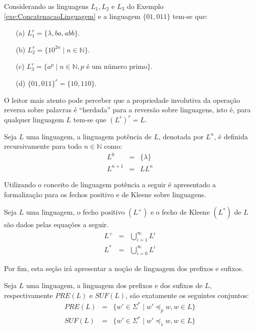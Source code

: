\begin{example}
	Considerando as linguagens $L_1, L_2$ e $L_3$ do Exemplo \ref{exe:ConcatenacaoLinguagem} e a linguagem $\{01, 011\}$ tem-se que:
	\begin{itemize}
		\item[(a)] $L_1^r = \{\lambda, ba, abb\}$.
		\item[(b)] $L_2^r = \{10^{2n} \mid n \in \mathbb{N}\}$.
		\item[(c)] $L_3^r = \{a^p \mid n \in \mathbb{N}, p \text{ é um número primo}\}$.
		\item[(d)] $\{01, 011\}^r = \{10, 110\}$.
	\end{itemize}
\end{example}

\begin{remark}
	O leitor mais atento pode perceber que a propriedade involutiva da operação reversa sobre palavras é ``herdada'' para a reversão sobre linguagens, isto é, para qualquer linguagem $L$ tem-se que $(L^r)^r = L$. 
\end{remark}

\begin{definition}
	Seja $L$ uma linguagem, a linguagem potência de $L$, denotada por $L^n$, é definida recursivamente para todo $n \in \mathbb{N}$ como:
	\begin{eqnarray}
		L^0 & = &\{\lambda\}\\
		L^{n+1} & = &  LL^{n}
	\end{eqnarray}
\end{definition}

Utilizando o conceito de linguagem potência a seguir é apresentado a formalização para os fechos positivo e de Kleene sobre linguagens.

\begin{definition}\label{def:FechoPositivoKleeneLinguagem}
	Seja $L$ uma linguagem, o fecho positivo $(L^+)$ e o fecho de Kleene $(L^*)$ de $L$ são dados pelas equações a seguir.
	\begin{eqnarray}
		L^+ & = & \bigcup_{i = 1}^\infty L^i\\
		L^* & = & \bigcup_{i = 0}^\infty L^i
	\end{eqnarray}
\end{definition}

Por fim, esta seção irá apresentar a noção de linguagem dos prefixos e sufixos.

\begin{definition}\label{def:LinguagemPrefixosSufixos}
	Seja $L$ uma linguagem, a linguagem dos prefixos e dos sufixos de $L$, respectivamente $PRE(L)$ e $SUF(L)$, são exatamente os seguintes conjuntos:
	\begin{eqnarray*}
		PRE(L) & = & \{w' \in \Sigma^* \mid w' \preceq_p w, w \in L\}\\
		SUF(L) & = & \{w' \in \Sigma^* \mid w' \preceq_s w, w \in L\}
	\end{eqnarray*}
\end{definition}

